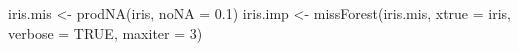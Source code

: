 iris.mis <- prodNA(iris, noNA = 0.1)
iris.imp <- missForest(iris.mis, xtrue = iris, verbose = TRUE, maxiter = 3)

